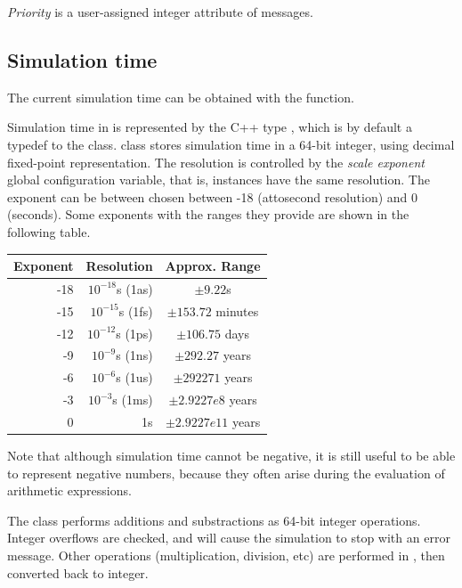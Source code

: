 \textit{Priority} is a user-assigned integer
attribute of messages.



\subsection{Simulation time}
\label{sec:simple-modules:simulation-time}

The current simulation time can be obtained with the  function.

Simulation time in {\opp} is represented by the C++ type ,
which is by default a typedef to the  class.
 class stores simulation time in a 64-bit integer,
using decimal fixed-point representation. The resolution is controlled
by the \textit{scale exponent} global configuration variable, that is,
 instances have the same resolution. The exponent can be
between chosen between -18 (attosecond resolution) and 0 (seconds).
Some exponents with the ranges they provide are shown in the following table.

\begin{center}
  \begin{tabular}{ | r | r | c | }
    \hline
    Exponent & Resolution & Approx. Range \\ \hline
     -18 & $10^{-18}$s (1as) & $\pm 9.22$s \\
     -15 & $10^{-15}$s (1fs) & $\pm 153.72$ minutes \\
     -12 & $10^{-12}$s (1ps) & $\pm 106.75$ days \\
     -9  & $10^{-9}$s (1ns)  & $\pm 292.27$ years \\
     -6  & $10^{-6}$s (1us)  & $\pm 292271$ years \\
     -3  & $10^{-3}$s (1ms)  & $\pm 2.9227e8$ years \\
     0   & 1s                & $\pm 2.9227e11$ years \\
    \hline
  \end{tabular}
\end{center}

Note that although simulation time cannot be negative, it is still useful to
be able to represent negative numbers, because they often arise
during the evaluation of arithmetic expressions.

The  class performs additions and substractions as 64-bit integer
operations. Integer overflows are checked, and will cause the simulation to
stop with an error message. Other operations (multiplication, division, etc)
are performed in , then converted back to integer.

